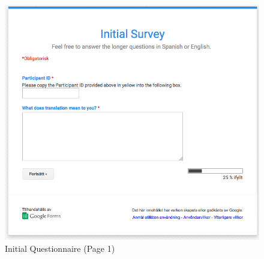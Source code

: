 \begin{figure}[H]
\myfloatalign
\includegraphics[width=\textwidth]{img/initial_questionnaire/initial_1.png}
\caption{Initial Questionnaire (Page 1)}
\end{figure}

